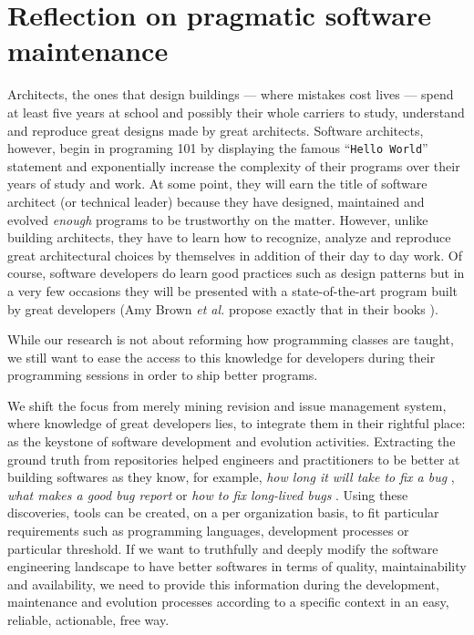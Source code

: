 \documentclass[11pt,a4paper, cuthesis]{report}
\begin{document}





\chapter{Reflection on pragmatic software maintenance}

Architects, the ones that design buildings --- where mistakes cost lives --- spend at least five years at school and possibly their whole carriers to study, understand and reproduce great designs made by great architects.
Software architects, however, begin in programing 101 by displaying the famous ``{\tt Hello World}'' statement and exponentially increase the complexity of their programs over their years of study and work.
At some point, they will earn the title of software architect (or technical leader) because they have designed, maintained and evolved {\it enough} programs to be trustworthy on the matter.
However, unlike building architects, they have to learn how to recognize, analyze and reproduce great architectural choices by themselves in addition of their day to day work.
Of course, software developers do learn good practices such as design patterns \cite{Gamma2008} but in a very few occasions they will be presented with a state-of-the-art program built by great developers (Amy Brown {\it et al.} propose exactly that in their books \cite{chansler2011architecture, AmyBrown2012, Armstrong2013}).

While our research is not about reforming how programming classes are taught, we still want to ease the access to this knowledge for developers during their programming sessions in order to ship better programs.

We shift the focus from merely mining revision and issue management system, where knowledge of great developers lies, to integrate them in their rightful place: as the keystone of software development and evolution activities.
Extracting the ground truth from repositories helped engineers and practitioners to be better at building softwares as they know, for example, {\it how long it will take to fix a bug} \cite{Weiss2007}, {\it what makes a good bug report} \cite{Bettenburg2008} or {\it how to fix long-lived bugs} \cite{Saha2014}.
Using these discoveries, tools can be created, on a per organization basis, to fit particular requirements such as programming languages, development processes or particular threshold. If we want to truthfully and deeply modify the software engineering landscape to have better softwares in terms of quality, maintainability and availability, we need to provide this information during the development, maintenance and evolution processes according to a specific context in an easy, reliable, actionable, free way.
\end{document}
